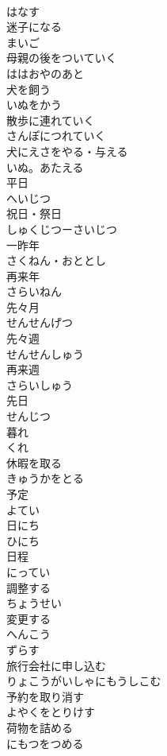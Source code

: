 \documentclass[8pt]{extreport}
\begin{document}
\begin{CJK}{UTF8}{min}
\\	はなす
\\	迷子になる	
\\	まいご
\\	母親の後をついていく	
\\	ははおやのあと
\\	犬を飼う	
\\	いぬをかう
\\	散歩に連れていく	
\\	さんぽにつれていく
\\	犬にえさをやる・与える	
\\	いぬ。あたえる
\\	平日	
\\	へいじつ
\\	祝日・祭日	
\\	しゅくじつーさいじつ
\\	一昨年	
\\	さくねん・おととし
\\	再来年	
\\	さらいねん
\\	先々月	
\\	せんせんげつ
\\	先々週	
\\	せんせんしゅう
\\	再来週	
\\	さらいしゅう
\\	先日	
\\	せんじつ
\\	暮れ	
\\	くれ
\\	休暇を取る	
\\	きゅうかをとる
\\	予定	
\\	よてい
\\	日にち	
\\	ひにち
\\	日程	
\\	にってい
\\	調整する	
\\	ちょうせい
\\	変更する	
\\	へんこう
\\	ずらす	
\\	旅行会社に申し込む	
\\	りょこうがいしゃにもうしこむ
\\	予約を取り消す	
\\	よやくをとりけす
\\	荷物を詰める	
\\	にもつをつめる

\end{CJK}
\end{document}
